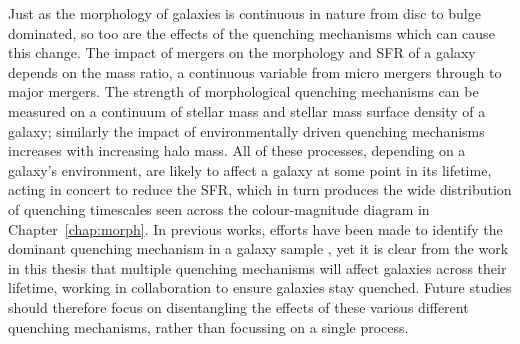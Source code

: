 Just as the morphology of galaxies is continuous in nature from disc to bulge dominated, so too are the effects of the quenching mechanisms which can cause this change. The impact of mergers on the morphology and SFR of a galaxy depends on the mass ratio, a continuous variable from micro mergers \citep{carlin16} through to major mergers. The strength of morphological quenching mechanisms can be measured on a continuum of stellar mass and stellar mass surface density of a galaxy; similarly the impact of environmentally driven quenching mechanisms increases with increasing halo mass. All of these processes, depending on a galaxy's environment, are likely to affect a galaxy at some point in its lifetime, acting in concert to reduce the SFR, which in turn produces the wide distribution of quenching timescales seen across the colour-magnitude diagram in Chapter~\ref{chap:morph}. In previous works, efforts have been made to identify the dominant quenching mechanism in a galaxy sample \citep[e.g.][]{muzzin12, schawinski14, foltz15, woo15, balogh16, darvish16, huertascompany16}, yet it is clear from the work in this thesis that multiple quenching mechanisms will affect galaxies across their lifetime, working in collaboration to ensure galaxies stay quenched. Future studies should therefore focus on disentangling the effects of these various different quenching mechanisms, rather than focussing on a single process. 


